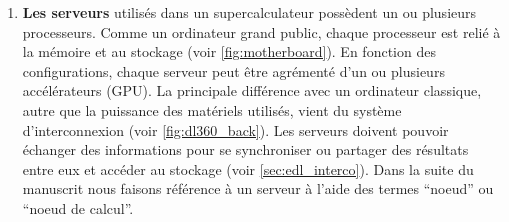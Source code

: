         \begin{enumerate}
        
            \item \textbf{Les serveurs} utilisés dans un supercalculateur possèdent un ou plusieurs processeurs. Comme un ordinateur grand public, chaque processeur est relié à la mémoire et au stockage (voir \autoref{fig:motherboard}). En fonction des configurations, chaque serveur peut être agrémenté d'un ou plusieurs accélérateurs (GPU). La principale différence avec un ordinateur classique, autre que la puissance des matériels utilisés, vient du système d'interconnexion (voir \autoref{fig:dl360_back}). Les serveurs doivent pouvoir échanger des informations pour se synchroniser ou partager des résultats entre eux et accéder au stockage (voir \autoref{sec:edl_interco}). Dans la suite du manuscrit nous faisons référence à un serveur à l'aide des termes ``noeud'' ou ``noeud de calcul''. 
        

\end{enumerate}
